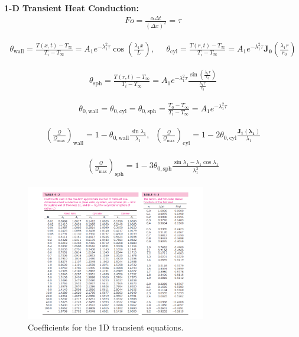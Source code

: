\begin{datasheet}
{\bf 1-D Transient Heat Conduction:}
\begin{align*}
   Fo = \frac{\alpha \Delta t}{\left(\Delta x\right)^{2}} = \tau
\end{align*}


\begin{align*}
   \theta_{\text{wall}} = \frac{T(x,t)-T_{\infty}}{T_{i}-T_{\infty}}= A_{1}e^{-\lambda_{1}^{2}\tau}\cos{\left(\frac{\lambda_{1}x}{L}\right)},\;\;\;\;\; \theta_{\text{cyl}} = \frac{T(r,t)-T_{\infty}}{T_{i}-T_{\infty}}= A_{1}e^{-\lambda_{1}^{2}\tau}\mathbf{J_{0}}\left(\frac{\lambda_{1}r}{r_{0}}\right)
\end{align*}

\begin{align*}
   \theta_{\text{sph}} = \frac{T(r,t)-T_{\infty}}{T_{i}-T_{\infty}}= A_{1}e^{-\lambda_{1}^{2}\tau}\frac{\sin{\left(\frac{\lambda_{1}r}{r_{0}}\right)}}{\frac{\lambda_{1}r}{r_{0}}}
\end{align*}

\begin{align*}
   \theta_{0,\text{wall}} = \theta_{0,\text{cyl}} = \theta_{0,\text{sph}} = \frac{T_{0}-T_{\infty}}{T_{i}-T_{\infty}} = A_{1}e^{-\lambda_{1}^{2}\tau}
\end{align*}

\begin{align*}
   \left(\frac{\mathcal{Q}}{\mathcal{Q}_{\text{max}}}\right)_{\text{wall}} = 1 - \theta_{0,\text{wall}}\frac{\sin{\lambda_{1}}}{\lambda_{1}},\;\;\left(\frac{\mathcal{Q}}{\mathcal{Q}_{\text{max}}}\right)_{\text{cyl}} = 1- 2\theta_{0,\text{cyl}}\frac{\mathbf{J_{1}\left(\lambda_{1}\right)}}{\lambda_{1}}
\end{align*}

\begin{align*}
    \left(\frac{\mathcal{Q}}{\mathcal{Q}_{\text{max}}}\right)_{\text{sph}} = 1 - 3\theta_{0,\text{sph}}\frac{\sin{\lambda_{1}}-\lambda_{1}\cos{\lambda_{1}}}{\lambda_{1}^{3}}
\end{align*}

\begin{figure}[h!]%
  \begin{center}%
    \includegraphics[width=0.7\textwidth,clip]{figures/BaselFunctionTable}
  \end{center}
  \caption{Coefficients for the 1D transient equations.}
\end{figure}



\end{datasheet}
